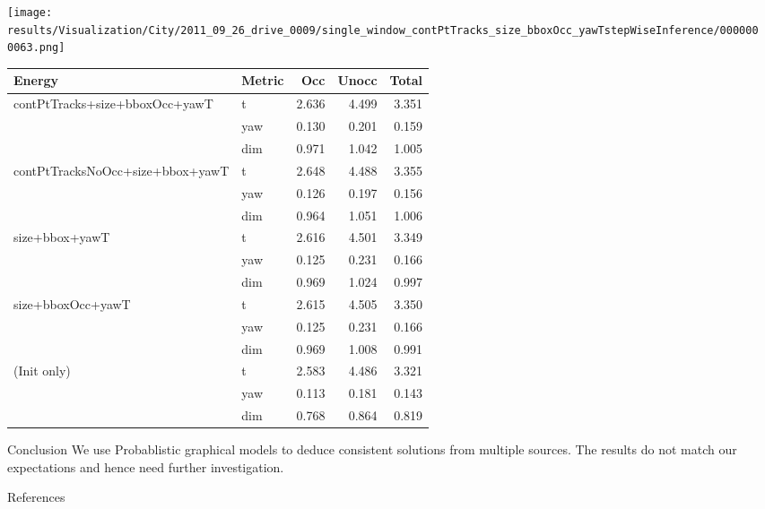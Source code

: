 \documentclass[handout,final]{beamer}
\newlength{\sepwid}
\newlength{\onecolwid}
\begin{document}
\begin{frame}[t]
\begin{columns}[t]
    \begin{column}{\onecolwid}
      \begin{block}{}
        \texttt{[image: results/Visualization/City/2011\_09\_26\_drive\_0009/single\_window\_contPtTracks\_size\_bboxOcc\_yawTstepWiseInference/0000000063.png]}
      \end{block}
      \begin{table}
        \begin{tabular}{|l|l|r|r|r|}
          \hline
          Energy & Metric & Occ & Unocc & Total\\
          \hline
contPtTracks+size+bboxOcc+yawT  &t  &2.636&4.499&3.351\\
                                &yaw&0.130&0.201&0.159\\
                                &dim&0.971&1.042&1.005\\
          \hline
contPtTracksNoOcc+size+bbox+yawT&t  &2.648&4.488&3.355\\
                                &yaw&0.126&0.197&0.156\\
                                &dim&0.964&1.051&1.006\\
          \hline
                  size+bbox+yawT&t  &2.616&4.501&3.349\\
                                &yaw&0.125&0.231&0.166\\
                                &dim&0.969&1.024&0.997\\
          \hline
               size+bboxOcc+yawT&t  &2.615&4.505&3.350\\
                                &yaw&0.125&0.231&0.166\\
                                &dim&0.969&1.008&0.991\\
          \hline
          (Init only)           &t  &2.583&4.486&3.321\\
                                &yaw&0.113&0.181&0.143\\
                                &dim&0.768&0.864&0.819\\
          \hline
          
        \end{tabular}
      \end{table}
      \begin{block}{Conclusion}
        We use Probablistic graphical models to deduce consistent solutions from multiple sources. The results do not match our expectations and hence need further investigation.
      \end{block}
      \begin{block}{References}
        {\small
          
        }
      \end{block}
    \end{column}

  \begin{column}{\sepwid}\end{column}			%

  \end{columns}
\end{frame}


\end{document}
